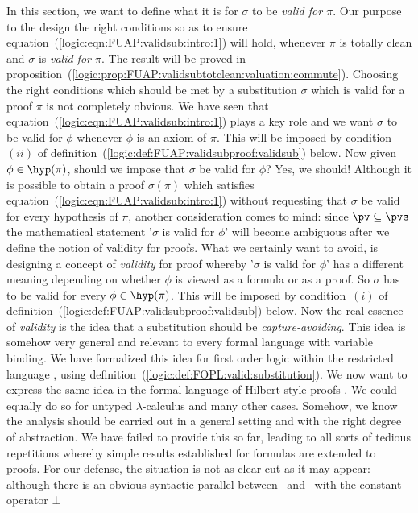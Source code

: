 In this section, we want to define what it is for $\sigma$ to be
{\em valid for $\pi$}. Our purpose to the design the right
conditions so as to ensure
equation~(\ref{logic:eqn:FUAP:validsub:intro:1}) will hold, whenever
$\pi$ is totally clean and $\sigma$ is {\em valid for $\pi$}. The
result will be proved in
proposition~(\ref{logic:prop:FUAP:validsubtotclean:valuation:commute}).
Choosing the right conditions which should be met by a substitution
$\sigma$ which is valid for a proof $\pi$ is not completely obvious.
We have seen that equation~(\ref{logic:eqn:FUAP:validsub:intro:1})
plays a key role and we want $\sigma$ to be valid for $\phi$
whenever $\phi$ is an axiom of $\pi$. This will be imposed by
condition~$(ii)$ of
definition~(\ref{logic:def:FUAP:validsubproof:validsub}) below. Now
given $\phi\in\hyp(\pi)$, should we impose that $\sigma$ be valid
for $\phi$? Yes, we should! Although it is possible to obtain a
proof $\sigma(\pi)$ which satisfies
equation~(\ref{logic:eqn:FUAP:validsub:intro:1}) without requesting
that $\sigma$ be valid for every hypothesis of $\pi$, another
consideration comes to mind: since $\pv\subseteq\pvs$ the
mathematical statement '$\sigma$ is valid for $\phi$' will become
ambiguous after we define the notion of validity for proofs. What we
certainly want to avoid, is designing a concept of {\em validity}
for proof whereby '$\sigma$ is valid for $\phi$' has a different
meaning depending on whether $\phi$ is viewed as a formula or as a
proof. So $\sigma$ has to be valid for every $\phi\in\hyp(\pi)$.
This will be imposed by condition~$(i)$ of
definition~(\ref{logic:def:FUAP:validsubproof:validsub}) below. Now
the real essence of {\em validity} is the idea that a substitution
should be {\em capture-avoiding}. This idea is somehow very general
and relevant to every formal language with variable binding. We have
formalized this idea for first order logic within the restricted
language \pv, using
definition~(\ref{logic:def:FOPL:valid:substitution}). We now want to
express the same idea in the formal language of Hilbert style proofs
\pvs. We could equally do so for untyped $\lambda$-calculus and many
other cases. Somehow, we know the analysis should be carried out in
a general setting and with the right degree of abstraction. We have
failed to provide this so far, leading to all sorts of tedious
repetitions whereby simple results established for formulas are
extended to proofs. For our defense, the situation is not as clear
cut as it may appear: although there is an obvious syntactic
parallel between \pv\ and \pvs\ with the constant operator $\bot$
